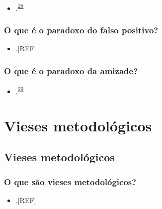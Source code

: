 \documentclass[
  a4paper,
]{book}
\providecommand{\tightlist}{%
  \setlength{\itemsep}{0pt}\setlength{\parskip}{0pt}}
\begin{document}
\begin{itemize}
\tightlist
\item
  .\textsuperscript{\protect\hyperlink{ref-de1996}{28}}
\end{itemize}

\hypertarget{falso-positivo}{%
\subsection{O que é o paradoxo do falso positivo?}\label{falso-positivo}}

\begin{itemize}
\tightlist
\item
  .{[}REF{]}
\end{itemize}

\hypertarget{amizade}{%
\subsection{O que é o paradoxo da amizade?}\label{amizade}}

\begin{itemize}
\tightlist
\item
  .\textsuperscript{\protect\hyperlink{ref-feld1991}{29}}
\end{itemize}

\hypertarget{vieses-metodologicos}{%
\chapter{\texorpdfstring{\textbf{Vieses metodológicos}}{Vieses metodológicos}}\label{vieses-metodologicos}}

\hypertarget{vieses-metodologicos}{%
\section{Vieses metodológicos}\label{vieses-metodologicos}}

\hypertarget{o-que-suxe3o-vieses-metodoluxf3gicos}{%
\subsection{O que são vieses metodológicos?}\label{o-que-suxe3o-vieses-metodoluxf3gicos}}

\begin{itemize}
\tightlist
\item
  .{[}REF{]}
\end{itemize}

\end{document}
